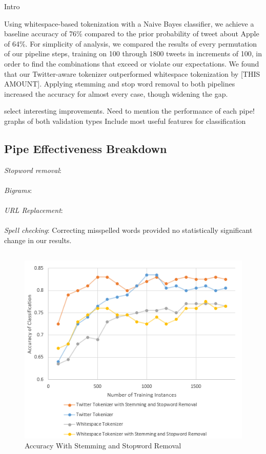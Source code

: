 \documentclass[letterpaper]{article}
\begin{document}
Intro

Using whitespace-based tokenization with a Naive Bayes classifier, we achieve a baseline accuracy of 76\% %
compared to the prior probability of tweet about Apple of 64\%. For simplicity of analysis, we compared the results of every permutation of our pipeline steps, training on 100 through 1800 tweets in increments of 100, in order to find the combinations that exceed or violate our expectations. We found that our Twitter-aware tokenizer outperformed whitespace tokenization by [THIS AMOUNT]. Applying stemming and stop word removal to both pipelines increased the accuracy for almost every case, though widening the gap. 

  select interesting improvements.
  Need to mention the performance of each pipe!
  graphs of both validation types
  Include most useful features for classification


\subsection{Pipe Effectiveness Breakdown}

\textit{Stopword removal}: \\
~\\
\textit{Bigrams}: \\
~\\
\textit{URL Replacement}: \\
~\\
\textit{Spell checking}: Correcting misspelled words provided no statistically significant change in our results. \\


\subsection{}


\begin{figure}[ht]
\centering
\includegraphics[width=\linewidth]{chart_twitterVSwhitespace}
\caption{Accuracy With Stemming and Stopword Removal}
\label{fig:chart_twitterwhitespace}
\end{figure}
\end{document}

